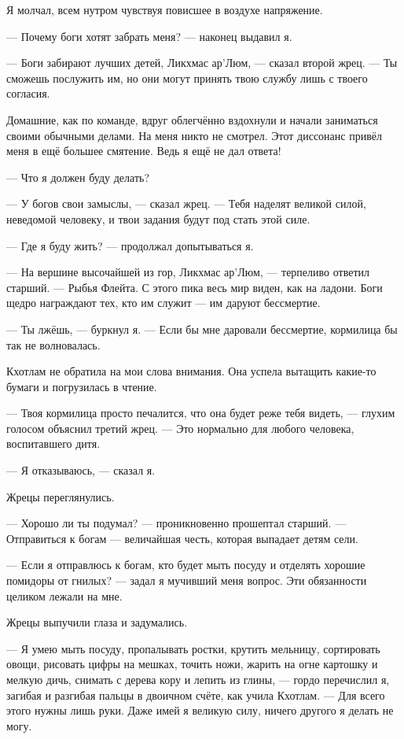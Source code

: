 Я молчал, всем нутром чувствуя повисшее в воздухе напряжение.

--- Почему боги хотят забрать меня? --- наконец выдавил я.

--- Боги забирают лучших детей, Ликхмас ар’Люм, --- сказал второй жрец.
--- Ты сможешь послужить им, но они могут принять твою службу лишь с твоего согласия.

Домашние, как по команде, вдруг облегчённо вздохнули и начали заниматься своими обычными делами.
На меня никто не смотрел.
Этот диссонанс привёл меня в ещё большее смятение.
Ведь я ещё не дал ответа!

--- Что я должен буду делать?

--- У богов свои замыслы, --- сказал жрец.
--- Тебя наделят великой силой, неведомой человеку, и твои задания будут под стать этой силе.

--- Где я буду жить? --- продолжал допытываться я.

--- На вершине высочайшей из гор, Ликхмас ар’Люм, --- терпеливо ответил старший.
--- Рыбья Флейта.
С этого пика весь мир виден, как на ладони.
Боги щедро награждают тех, кто им служит --- им даруют бессмертие.

--- Ты лжёшь, --- буркнул я.
--- Если бы мне даровали бессмертие, кормилица бы так не волновалась.

Кхотлам не обратила на мои слова внимания.
Она успела вытащить какие-то бумаги и погрузилась в чтение.

--- Твоя кормилица просто печалится, что она будет реже тебя видеть, --- глухим голосом объяснил третий жрец.
--- Это нормально для любого человека, воспитавшего дитя.

--- Я отказываюсь, --- сказал я.

Жрецы переглянулись.

--- Хорошо ли ты подумал? --- проникновенно прошептал старший.
--- Отправиться к богам --- величайшая честь, которая выпадает детям сели.

--- Если я отправлюсь к богам, кто будет мыть посуду и отделять хорошие помидоры от гнилых? --- задал я мучивший меня вопрос.
Эти обязанности целиком лежали на мне.

Жрецы выпучили глаза и задумались.

--- Я умею мыть посуду, пропалывать ростки, крутить мельницу, сортировать овощи, рисовать цифры на мешках, точить ножи, жарить на огне картошку и мелкую дичь, снимать с дерева кору и лепить из глины, --- гордо перечислил я, загибая и разгибая пальцы в двоичном счёте, как учила Кхотлам.
--- Для всего этого нужны лишь руки.
Даже имей я великую силу, ничего другого я делать не могу.

